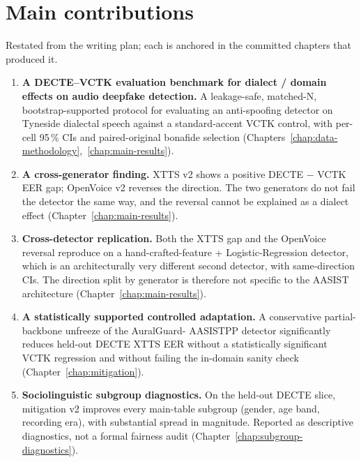 \section{Main contributions}
\label{sec:conclusion-contributions}

Restated from the writing plan; each is anchored in the
committed chapters that produced it.

\begin{enumerate}
    \item \textbf{A DECTE--VCTK evaluation benchmark for dialect / domain
        effects on audio deepfake detection.} A leakage-safe,
        matched-N, bootstrap-supported protocol for evaluating an
        anti-spoofing detector on Tyneside dialectal speech against a
        standard-accent VCTK control, with per-cell 95\,\% CIs and
        paired-original bonafide selection (Chapters~\ref{chap:data-methodology},~\ref{chap:main-results}).
    \item \textbf{A cross-generator finding.} XTTS v2 shows a positive
        DECTE $-$ VCTK EER gap; OpenVoice v2 reverses the direction.
        The two generators do not fail the detector the same way, and
        the reversal cannot be explained as a dialect effect
        (Chapter~\ref{chap:main-results}).
    \item \textbf{Cross-detector replication.} Both the XTTS gap and the
        OpenVoice reversal reproduce on a hand-crafted-feature +
        Logistic-Regression detector, which is an architecturally very
        different second detector, with same-direction CIs. The
        direction split by generator is therefore not specific to the
        AASIST architecture (Chapter~\ref{chap:main-results}).
    \item \textbf{A statistically supported controlled adaptation.} A
        conservative partial-backbone unfreeze of the AuralGuard-%
        AASISTPP detector significantly reduces held-out DECTE XTTS
        EER without a statistically significant VCTK regression and
        without failing the in-domain sanity check (Chapter~\ref{chap:mitigation}).
    \item \textbf{Sociolinguistic subgroup diagnostics.} On the held-out
        DECTE slice, mitigation v2 improves every main-table subgroup
        (gender, age band, recording era), with substantial spread in
        magnitude. Reported as descriptive diagnostics, not a formal
        fairness audit (Chapter~\ref{chap:subgroup-diagnostics}).
\end{enumerate}

